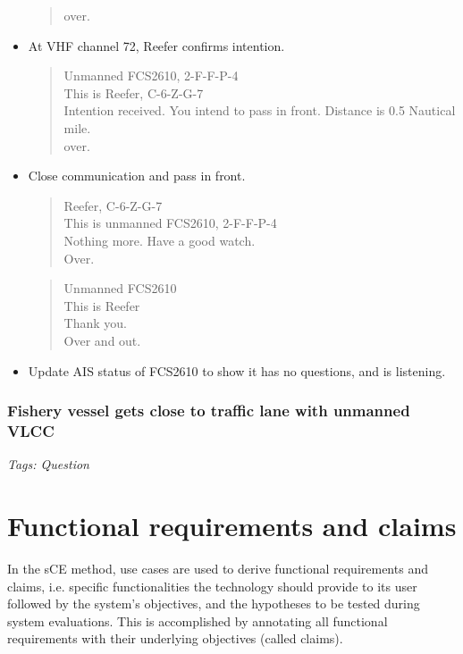 \begin{itemize}
\begin{quote}
			over.
		\end{quote}
	\item At \ac{VHF} channel 72, Reefer confirms intention.
		\begin{quote}
			Unmanned FCS2610, 2-F-F-P-4 \\
			This is Reefer, C-6-Z-G-7\\
			Intention received. You intend to pass in front. Distance is 0.5 Nautical mile.\\
			over.
		\end{quote}
	\item Close communication and pass in front.
		\begin{quote}
			Reefer, C-6-Z-G-7\\
			This is unmanned FCS2610, 2-F-F-P-4 \\
			Nothing more. Have a good watch. \\
			Over.
		\end{quote}
		\begin{quote}
			Unmanned FCS2610\\
			This is Reefer\\
			Thank you. \\
			Over and out.
		\end{quote}
	\item Update AIS status of FCS2610 to show it has no questions, and is listening.
\end{itemize}

\subsubsection{Fishery vessel gets close to traffic lane with unmanned VLCC}
\emph{Tags: Question}

\section{Functional requirements and claims}
In the sCE method, use cases are used to derive functional requirements and claims, i.e. specific functionalities the technology should provide to its user followed by the system’s objectives, and the hypotheses to be tested during system evaluations. This is accomplished by annotating all functional requirements with their underlying objectives (called claims).

